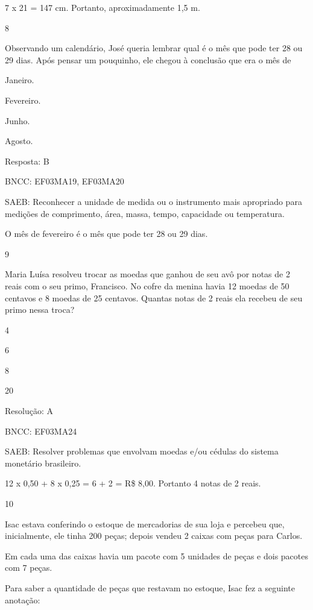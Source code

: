 \begin{escolha}
{\begin{escolha}
{7 x 21 = 147 cm. Portanto, aproximadamente 1,5 m.

\num{8}

Observando um calendário, José queria lembrar qual é o mês que pode ter
28 ou 29 dias. Após pensar um pouquinho, ele chegou à conclusão que era o mês de

\begin{escolha}
\item
  Janeiro.
\item
  Fevereiro.
\item
  Junho.
\item
  Agosto.
\end{escolha}

Resposta: B

BNCC: EF03MA19, EF03MA20

SAEB: Reconhecer a unidade de medida ou o instrumento mais
apropriado para medições de comprimento, área, massa, tempo, capacidade
ou temperatura.

O mês de fevereiro é o mês que pode ter 28 ou 29 dias.

\num{9}

Maria Luísa resolveu trocar as moedas que ganhou de seu avô por notas de
2 reais com o seu primo, Francisco. No cofre da menina havia 12 moedas de 50
centavos e 8 moedas de 25 centavos. Quantas notas de 2 reais ela recebeu
de seu primo nessa troca?

\begin{escolha}
\item
  4
\item
  6
\item
  8
\item
  20
\end{escolha}

Resolução: A

BNCC: EF03MA24

SAEB: Resolver problemas que envolvam moedas e/ou cédulas do
sistema monetário brasileiro.

12 x 0,50 + 8 x 0,25 = 6 + 2 = R\$ 8,00. Portanto 4 notas de 2 reais.

\num{10}

Isac estava conferindo o estoque de mercadorias de sua loja e percebeu
que, inicialmente, ele tinha 200 peças; depois vendeu 2 caixas com peças para Carlos.

Em cada uma das caixas havia um pacote com 5 unidades de peças e dois
pacotes com 7 peças.

Para saber a quantidade de peças que restavam no estoque, Isac fez a seguinte anotação:

}
\end{escolha}}
\end{escolha}
